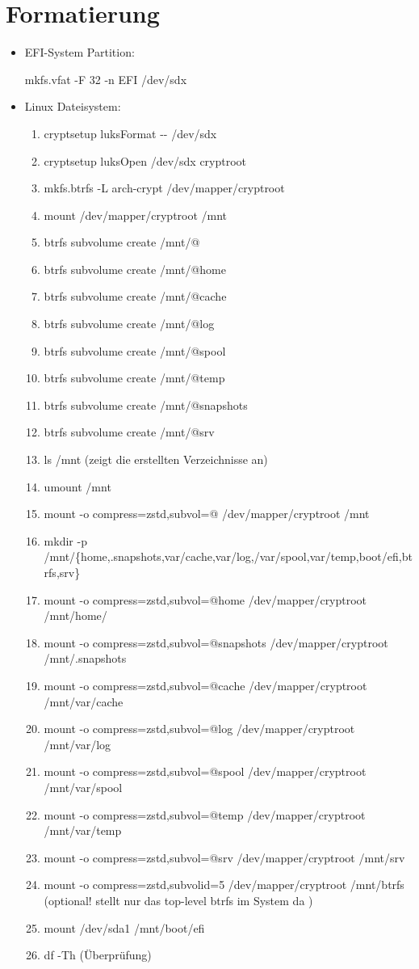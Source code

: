 \documentclass[11pt,a4paper]{article}
\begin{document}
\section{Formatierung}
\begin{itemize}
\item EFI-System Partition:

mkfs.vfat -F 32 -n EFI /dev/sdx

\item Linux Dateisystem:
\begin{enumerate}
\item cryptsetup luksFormat -{}-\textcolor{red}{}  /dev/sdx
\item cryptsetup luksOpen /dev/sdx 	cryptroot
\item mkfs.btrfs -L arch-crypt /dev/mapper/cryptroot
\item mount /dev/mapper/cryptroot /mnt
\item btrfs subvolume create /mnt/@
\item btrfs subvolume create /mnt/@home
\item btrfs subvolume create /mnt/@cache
\item btrfs subvolume create /mnt/@log
\item btrfs subvolume create /mnt/@spool
\item btrfs subvolume create /mnt/@temp
\item btrfs subvolume create /mnt/@snapshots
\item btrfs subvolume create /mnt/@srv
\item ls /mnt (zeigt die erstellten Verzeichnisse an)
\item umount /mnt
\item mount -o compress=zstd,subvol=@ /dev/mapper/cryptroot /mnt
\item mkdir -p /mnt/\{home,.snapshots,var/cache,var/log,/var/spool,var/temp,boot/efi,btrfs,srv\}
\item mount -o compress=zstd,subvol=@home /dev/mapper/cryptroot /mnt/home/
\item mount -o compress=zstd,subvol=@snapshots /dev/mapper/cryptroot /mnt/.snapshots
\item mount -o compress=zstd,subvol=@cache /dev/mapper/cryptroot /mnt/var/cache
\item mount -o compress=zstd,subvol=@log /dev/mapper/cryptroot /mnt/var/log
\item mount -o compress=zstd,subvol=@spool /dev/mapper/cryptroot /mnt/var/spool
\item mount -o compress=zstd,subvol=@temp /dev/mapper/cryptroot /mnt/var/temp
\item mount -o compress=zstd,subvol=@srv /dev/mapper/cryptroot /mnt/srv
\item mount -o compress=zstd,subvolid=5 /dev/mapper/cryptroot /mnt/btrfs (optional! stellt nur das top-level btrfs im System da )
\item mount /dev/sda1 /mnt/boot/efi
\item df -Th (Überprüfung)
\end{enumerate}
\end{itemize}
\end{document}
